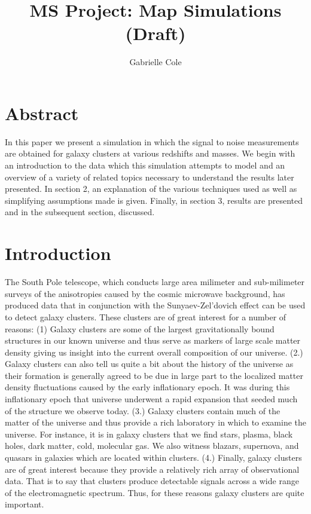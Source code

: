 \documentclass[12pt]{article} %
\title{MS Project: Map Simulations (Draft)}
\author{Gabrielle Cole}
\date{} %
\begin{document}
\maketitle
\tableofcontents

\section{Abstract}

In this paper we present a simulation in which the signal to noise measurements are obtained for galaxy clusters at various redshifts and masses. We begin with an introduction to the data which this simulation attempts to model and an overview of a variety of related topics necessary to understand the results later presented. In section 2, an explanation of the various techniques used as well as simplifying assumptions made is given. Finally, in section 3, results are presented and in the subsequent section, discussed. 
 

\section{Introduction}

The South Pole telescope, which conducts large area milimeter and sub-milimeter surveys of the anisotropies caused by the cosmic microwave background, has produced data that in conjunction with the Sunyaev-Zel'dovich effect can be used to detect galaxy clusters. These clusters are of great interest for a number of reasons: (1) Galaxy clusters are some of the largest gravitationally bound structures in our known universe and thus serve as markers of large scale matter density giving us insight into the current overall composition of our universe. (2.) Galaxy clusters can also tell us quite a bit about the history of the universe as their formation is generally agreed to be due in large part to the localized matter density fluctuations caused by the early inflationary epoch. It was during this inflationary epoch that universe underwent a rapid expansion that seeded much of the structure we observe today. (3.) Galaxy clusters contain much of the matter of the universe and thus provide a rich laboratory in which to examine the universe. For instance, it is in galaxy clusters that we find stars, plasma, black holes, dark matter, cold, molecular gas. We also witness blazars, supernova, and quasars in galaxies which are located within clusters. (4.) Finally, galaxy clusters are of great interest because they provide a relatively rich array of observational data. That is to say that clusters produce detectable signals across a wide range of the electromagnetic spectrum. Thus, for these reasons galaxy clusters are quite important.
\end{document}
